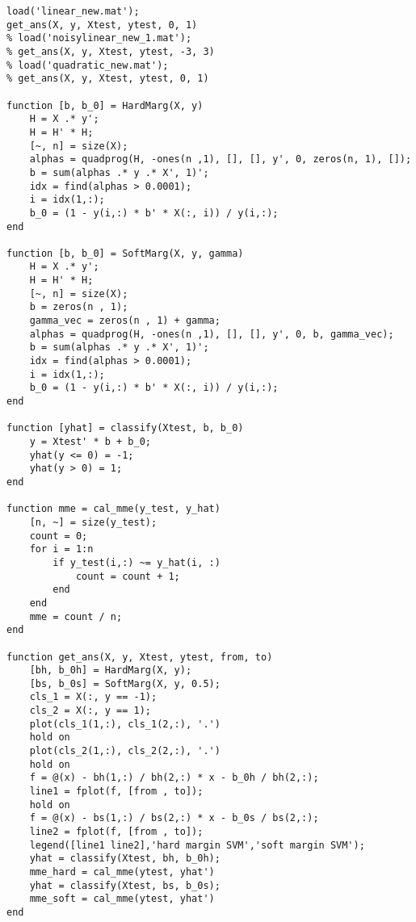 \documentclass[12pt]{article}
\begin{document}
\newpage
\begin{verbatim}
load('linear_new.mat');
get_ans(X, y, Xtest, ytest, 0, 1)
% load('noisylinear_new_1.mat');
% get_ans(X, y, Xtest, ytest, -3, 3)
% load('quadratic_new.mat');
% get_ans(X, y, Xtest, ytest, 0, 1)

function [b, b_0] = HardMarg(X, y)
    H = X .* y';
    H = H' * H;
    [~, n] = size(X);
    alphas = quadprog(H, -ones(n ,1), [], [], y', 0, zeros(n, 1), []);
    b = sum(alphas .* y .* X', 1)';
    idx = find(alphas > 0.0001);
    i = idx(1,:);
    b_0 = (1 - y(i,:) * b' * X(:, i)) / y(i,:);
end

function [b, b_0] = SoftMarg(X, y, gamma)
    H = X .* y';
    H = H' * H;
    [~, n] = size(X);
    b = zeros(n , 1);
    gamma_vec = zeros(n , 1) + gamma;
    alphas = quadprog(H, -ones(n ,1), [], [], y', 0, b, gamma_vec);
    b = sum(alphas .* y .* X', 1)';
    idx = find(alphas > 0.0001);
    i = idx(1,:);
    b_0 = (1 - y(i,:) * b' * X(:, i)) / y(i,:);
end

function [yhat] = classify(Xtest, b, b_0)
    y = Xtest' * b + b_0;
    yhat(y <= 0) = -1;
    yhat(y > 0) = 1;
end

function mme = cal_mme(y_test, y_hat)
    [n, ~] = size(y_test);
    count = 0;
    for i = 1:n
        if y_test(i,:) ~= y_hat(i, :)
            count = count + 1;
        end
    end
    mme = count / n;
end

function get_ans(X, y, Xtest, ytest, from, to)
    [bh, b_0h] = HardMarg(X, y);
    [bs, b_0s] = SoftMarg(X, y, 0.5);
    cls_1 = X(:, y == -1);
    cls_2 = X(:, y == 1);
    plot(cls_1(1,:), cls_1(2,:), '.')
    hold on
    plot(cls_2(1,:), cls_2(2,:), '.')
    hold on
    f = @(x) - bh(1,:) / bh(2,:) * x - b_0h / bh(2,:);
    line1 = fplot(f, [from , to]);
    hold on 
    f = @(x) - bs(1,:) / bs(2,:) * x - b_0s / bs(2,:);
    line2 = fplot(f, [from , to]);
    legend([line1 line2],'hard margin SVM','soft margin SVM');
    yhat = classify(Xtest, bh, b_0h);
    mme_hard = cal_mme(ytest, yhat')
    yhat = classify(Xtest, bs, b_0s);
    mme_soft = cal_mme(ytest, yhat')
end
\end{verbatim}
\end{document}
